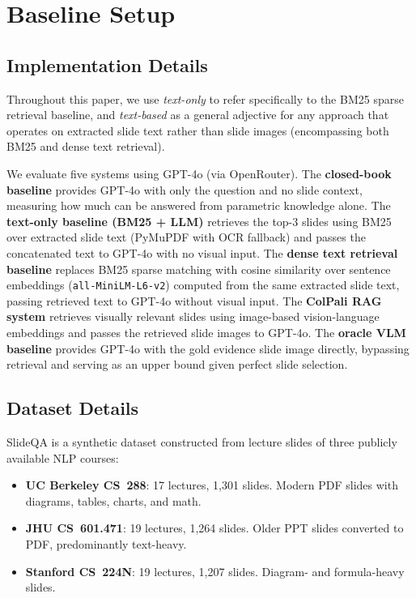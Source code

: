 \documentclass{article} %
\begin{document}
\section{Baseline Setup}
\label{sec:baselines}

\subsection{Implementation Details}

Throughout this paper, we use \textit{text-only} to refer specifically to the BM25 sparse retrieval baseline, and \textit{text-based} as a general adjective for any approach that operates on extracted slide text rather than slide images (encompassing both BM25 and dense text retrieval).

We evaluate five systems using GPT-4o (via OpenRouter). The \textbf{closed-book baseline} provides GPT-4o with only the question and no slide context, measuring how much can be answered from parametric knowledge alone. The \textbf{text-only baseline (BM25 + LLM)} retrieves the top-3 slides using BM25 over extracted slide text (PyMuPDF with OCR fallback) and passes the concatenated text to GPT-4o with no visual input. The \textbf{dense text retrieval baseline} replaces BM25 sparse matching with cosine similarity over sentence embeddings (\texttt{all-MiniLM-L6-v2}) computed from the same extracted slide text, passing retrieved text to GPT-4o without visual input. The \textbf{ColPali RAG system} retrieves visually relevant slides using image-based vision-language embeddings and passes the retrieved slide images to GPT-4o. The \textbf{oracle VLM baseline} provides GPT-4o with the gold evidence slide image directly, bypassing retrieval and serving as an upper bound given perfect slide selection.

\subsection{Dataset Details}

SlideQA is a synthetic dataset constructed from lecture slides of three publicly available NLP courses:

\begin{itemize}[nosep]
    \item \textbf{UC Berkeley CS~288}: 17 lectures, 1{,}301 slides. Modern PDF slides with diagrams, tables, charts, and math.
    \item \textbf{JHU CS~601.471}: 19 lectures, 1{,}264 slides. Older PPT slides converted to PDF, predominantly text-heavy.
    \item \textbf{Stanford CS~224N}: 19 lectures, 1{,}207 slides. Diagram- and formula-heavy slides.
\end{itemize}
\end{document}
